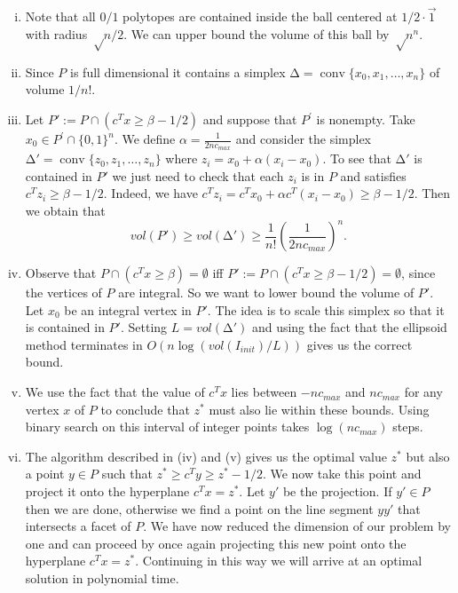 \documentclass[11pt]{article}
\DeclareMathOperator{\conv}{conv}
\renewcommand{\geq}{\geqslant}
\begin{document}
\begin{enumerate}[1)]
\begin{solution}
\begin{enumerate}[i)]
\item Note that all $0/1$ polytopes are contained inside the ball centered at $1/2\cdot \vec{1}$ with radius $√n/2$.
We can upper bound the volume of this ball by $√n^n$. 
\item Since $P$ is full dimensional it contains a simplex $∆ = \conv \{x_0,x_1,\hdots,x_n\}$ of volume $1/n!$. 
\item Let $P':= P ∩(c^Tx≥β−1/2)$ and suppose that $P^\prime$ is nonempty. Take $x_0 \in P^\prime \cap \{0,1\}^n$. We define $α=\frac{1}{2nc_{max}}$ and consider the simplex $∆'= \conv \{z_0,z_1,\hdots,z_{n}\}$ where $z_i = x_0 +α(x_i−x_0)$.
To see that $∆'$ is contained in $P'$ we just need to check that each $z_i$ is in $P$ and satisfies $c^Tz_i ≥β-1/2$. Indeed, we have 
$ c^Tz_i = c^Tx_0 + \alpha c^T(x_i-x_0) \geq \beta - 1/2 $.
Then we
obtain that
$$vol(P') ≥vol(∆') ≥\frac{1}{n!}\left( \frac{1}{2nc_{max}}\right)^n.$$
\item Observe that $P ∩(c^Tx ≥β) = ∅$ iﬀ
$P':= P ∩(c^Tx≥β−1/2) = ∅$, since the vertices of $P$ are integral. So we want to lower bound the
volume of $P'$. Let $x_0$ be an integral vertex in $P'$. The idea is to scale this simplex so that it is contained in
$P'$. 
Setting $L= vol(∆')$ and using the fact that the ellipsoid method terminates in $O(n\log(vol(I_{init})/L))$
gives us the correct bound.
\item We use the fact that the value of $c^Tx$ lies between $−nc_{max}$ and $nc_{max}$ for any vertex $x$ of $P$ to
conclude that $z^*$ must also lie within these bounds. Using binary search on this interval of integer
points takes $\log(nc_{max})$ steps.
\item The algorithm described in (iv) and (v) gives us the optimal value $z^*$ but also a point $y ∈P$
such that $z^*≥c^Ty≥z^*-1/2$. We now take this point and project it onto the hyperplane $c^Tx= z^*.$
Let $y'$ be the projection. If $y'∈P$ then we are done, otherwise we find a point on the line segment
$yy'$ that intersects a facet of $P$. We have now reduced the dimension of our problem by one and
can proceed by once again projecting this new point onto the hyperplane $c^Tx= z^*.$ Continuing in
this way we will arrive at an optimal solution in polynomial time.


\end{enumerate}

\end{solution}




\end{enumerate}
\end{document}
